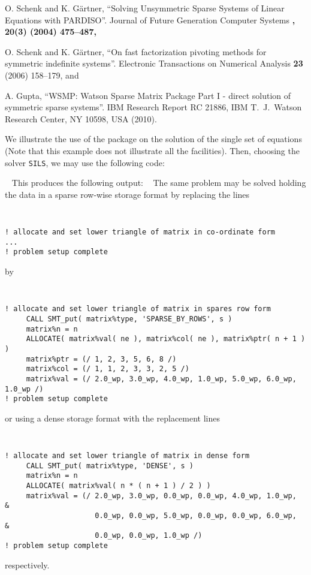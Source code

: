 \documentclass{galahad}
\begin{document}
\noindent
O. Schenk and K. G\"{a}rtner,
``Solving Unsymmetric Sparse Systems of Linear Equations with PARDISO''.
Journal of Future Generation Computer Systems \bf, 20(3) \rm (2004) 475--487, 

\noindent
O. Schenk and K. G\"{a}rtner,
``On fast factorization pivoting methods for symmetric indefinite systems''.
Electronic Transactions on Numerical Analysis
{\bf 23} (2006) 158--179,
and

\noindent
A. Gupta,
``WSMP: Watson Sparse Matrix Package Part I - direct
solution of symmetric sparse systems''.
IBM Research Report RC 21886, IBM T.\ J.\ Watson Research Center,
NY 10598, USA (2010).



\galexample
We illustrate the use of the package on the solution of the
single set of equations
(Note that this example does not illustrate all the facilities).
Then, choosing the solver {\tt SILS}, we may use the following code:

{\tt \small
\VerbatimInput{\packageexample}
}
\noindent
This produces the following output:
{\tt \small
\VerbatimInput{\packageresults}
}
\noindent
The same problem may be solved holding the data in
a sparse row-wise storage format by replacing the lines
{\tt \small
\begin{verbatim}
! allocate and set lower triangle of matrix in co-ordinate form
...
! problem setup complete
\end{verbatim}
}
\noindent
by
{\tt \small
\begin{verbatim}
! allocate and set lower triangle of matrix in spares row form
     CALL SMT_put( matrix%type, 'SPARSE_BY_ROWS', s )
     matrix%n = n 
     ALLOCATE( matrix%val( ne ), matrix%col( ne ), matrix%ptr( n + 1 ) )
     matrix%ptr = (/ 1, 2, 3, 5, 6, 8 /)
     matrix%col = (/ 1, 1, 2, 3, 3, 2, 5 /)
     matrix%val = (/ 2.0_wp, 3.0_wp, 4.0_wp, 1.0_wp, 5.0_wp, 6.0_wp, 1.0_wp /)
! problem setup complete
\end{verbatim}
}
\noindent
or using a dense storage format with the replacement lines
{\tt \small
\begin{verbatim}
! allocate and set lower triangle of matrix in dense form
     CALL SMT_put( matrix%type, 'DENSE', s )
     matrix%n = n 
     ALLOCATE( matrix%val( n * ( n + 1 ) / 2 ) )
     matrix%val = (/ 2.0_wp, 3.0_wp, 0.0_wp, 0.0_wp, 4.0_wp, 1.0_wp,           &
                     0.0_wp, 0.0_wp, 5.0_wp, 0.0_wp, 0.0_wp, 6.0_wp,           &
                     0.0_wp, 0.0_wp, 1.0_wp /)
! problem setup complete
\end{verbatim}
}
\noindent
respectively.
\end{document}
